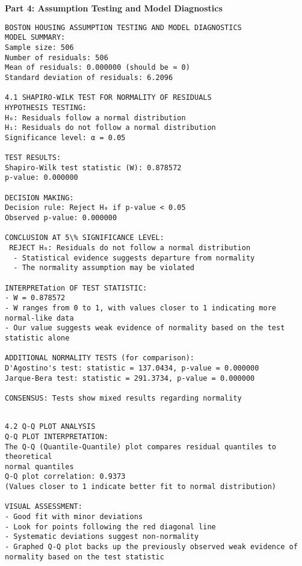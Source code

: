 \documentclass[8pt, twocolumn]{extarticle}
\begin{document}
    \textbf{Part 4: Assumption Testing and Model Diagnostics}

    \begin{Verbatim}[commandchars=\\\{\}]
BOSTON HOUSING ASSUMPTION TESTING AND MODEL DIAGNOSTICS
MODEL SUMMARY:
Sample size: 506
Number of residuals: 506
Mean of residuals: 0.000000 (should be ≈ 0)
Standard deviation of residuals: 6.2096

4.1 SHAPIRO-WILK TEST FOR NORMALITY OF RESIDUALS
HYPOTHESIS TESTING:
H₀: Residuals follow a normal distribution
H₁: Residuals do not follow a normal distribution
Significance level: α = 0.05

TEST RESULTS:
Shapiro-Wilk test statistic (W): 0.878572
p-value: 0.000000

DECISION MAKING:
Decision rule: Reject H₀ if p-value < 0.05
Observed p-value: 0.000000

CONCLUSION AT 5\% SIGNIFICANCE LEVEL:
 REJECT H₀: Residuals do not follow a normal distribution
  - Statistical evidence suggests departure from normality
  - The normality assumption may be violated

INTERPRETation OF TEST STATISTIC:
- W = 0.878572
- W ranges from 0 to 1, with values closer to 1 indicating more normal-like data
- Our value suggests weak evidence of normality based on the test statistic alone

ADDITIONAL NORMALITY TESTS (for comparison):
D'Agostino's test: statistic = 137.0434, p-value = 0.000000
Jarque-Bera test: statistic = 291.3734, p-value = 0.000000

CONSENSUS: Tests show mixed results regarding normality
    \end{Verbatim}


    \begin{Verbatim}[commandchars=\\\{\}]

4.2 Q-Q PLOT ANALYSIS
Q-Q PLOT INTERPRETATION:
The Q-Q (Quantile-Quantile) plot compares residual quantiles to theoretical
normal quantiles
Q-Q plot correlation: 0.9373
(Values closer to 1 indicate better fit to normal distribution)

VISUAL ASSESSMENT:
- Good fit with minor deviations
- Look for points following the red diagonal line
- Systematic deviations suggest non-normality
- Graphed Q-Q plot backs up the previously observed weak evidence of normality based on the test statistic
    \end{Verbatim}
\end{document}
